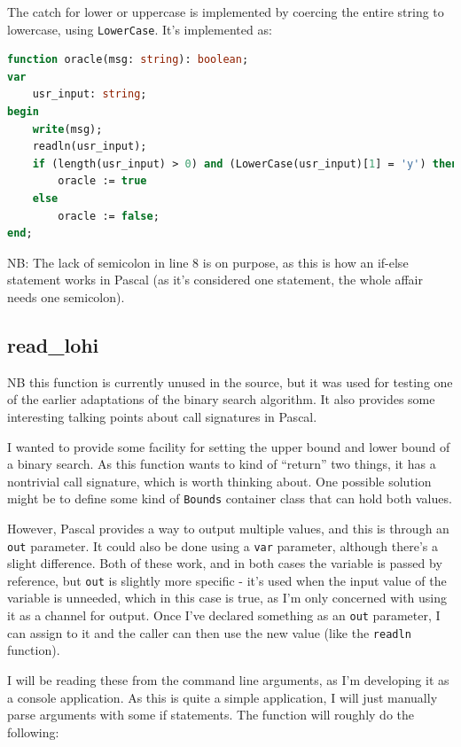 \documentclass{article}
\begin{document}
    The catch for lower or uppercase is implemented by coercing the entire
    string to lowercase, using \verb|LowerCase|. It's implemented as:

\begin{lstlisting}[language=Pascal, caption=oracle implementation]
function oracle(msg: string): boolean;
var
    usr_input: string;
begin
    write(msg);
    readln(usr_input);
    if (length(usr_input) > 0) and (LowerCase(usr_input)[1] = 'y') then
        oracle := true
    else
        oracle := false;
end;
\end{lstlisting}

    NB: The lack of semicolon in line 8 is on purpose, as this is how an
    if-else statement works in Pascal (as it's considered one statement, the
    whole affair needs one semicolon).

    \subsection{read\_lohi}
    NB this function is currently unused in the source, but it was used for
    testing one of the earlier adaptations of the binary search algorithm. It
    also provides some interesting talking points about call signatures in
    Pascal.

    I wanted to provide some facility for setting the upper bound and lower
    bound of a binary search. As this function wants to kind of ``return'' two
    things, it has a nontrivial call signature, which is worth thinking about.
    One possible solution might be to define some kind of \verb|Bounds|
    container class that can hold both values.
    
    However, Pascal provides a way to output multiple values, and this is
    through an \verb|out| parameter. It could also be done using a \verb|var|
    parameter, although there's a slight difference. Both of these work, and in
    both cases the variable is passed by reference, but \verb|out| is slightly
    more specific - it's used when the input value of the variable is unneeded,
    which in this case is true, as I'm only concerned with using it as a channel
    for output. Once I've declared something as an \verb|out| parameter, I can
    assign to it and the caller can then use the new value (like the
    \verb|readln| function).

    I will be reading these from the command line arguments, as I'm developing
    it as a console application. As this is quite a simple application, I will
    just manually parse arguments with some if statements. The function will
    roughly do the following:
\end{document}
